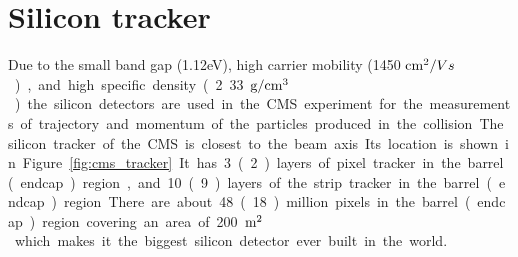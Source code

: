 
\section{Silicon tracker}
\label{ss:cms_tracker}
Due to the small band gap (1.12\unit{eV}), high carrier mobility (1450 \unit{$\rm{cm}^2/Vs$}), 
and high specific density (2.33 \unit{$\rm{g}/\rm{cm}^3$}) the silicon detectors are used in 
the CMS experiment for the measurements of trajectory and momentum of the particles 
produced in the collision.
The silicon tracker of the CMS is closest to the beam axis. Its location is shown in 
Figure~\ref{fig:cms_tracker}. It has 3 (2) layers of pixel tracker in the barrel (endcap) region, and
10 (9) layers of the strip tracker in the barrel (endcap) region. There are about 48 
(18) million pixels in the barrel (endcap) region covering an area of 200\unit{$\rm{m}^2$} which
makes it the biggest silicon detector ever built in the world.
